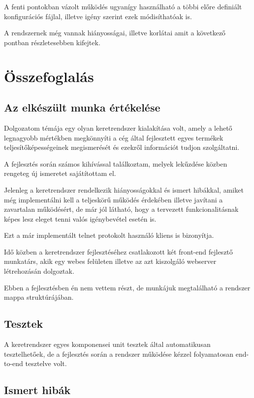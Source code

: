 \documentclass[a4paper,12pt,oneside]{report}
\begin{document}
A fenti pontokban vázolt működés ugyanígy használható a többi előre definiált konfigurációs fájlal, illetve igény szerint ezek módisíthatóak is.

A rendszernek még vannak hiányosságai, illetve korlátai amit a következő pontban részletesebben kifejtek.

\section{Összefoglalás}
\subsection{Az elkészült munka értékelése}

Dolgozatom témája egy olyan keretrendszer kialakítása volt, amely a lehető legnagyobb mértékben megkönnyíti a cég által fejlesztett egyes termékek teljesítőképességeinek megismerését és ezekről információt tudjon szolgáltatni.

A fejlesztés során számos kihívással találkoztam, melyek lekűzdése közben rengeteg új ismeretet sajátítottam el.

Jelenleg a keretrendszer rendelkezik hiányosságokkal és ismert hibákkal, amiket még implementálni kell a teljeskörű működés érdekében illetve javítani a zavartalan működésért, de már jól látható, hogy a tervezett funkcionalitásnak képes lesz eleget tenni valós igénybevétel esetén is.

Ezt a már implementált telnet protokolt használó kliens is bizonyítja.

Idő közben a keretrendszer fejlesztéséhez csatlakozott két front-end fejlesztő munkatárs, akik egy webes felületen illetve az azt kiszolgáló webserver létrehozásán dolgoztak.

Ebben a fejlesztésben én nem vettem részt, de munkájuk megtalálható a rendszer mappa struktúrájában.

\subsection{Tesztek}

A keretrendszer egyes komponensei unit tesztek által automatikusan tesztelhetőek, de a fejlesztés során a rendszer működése kézzel folyamatosan end-to-end\cite{website:end2end} tesztelve volt.


\subsection{Ismert hibák}
\end{document}
